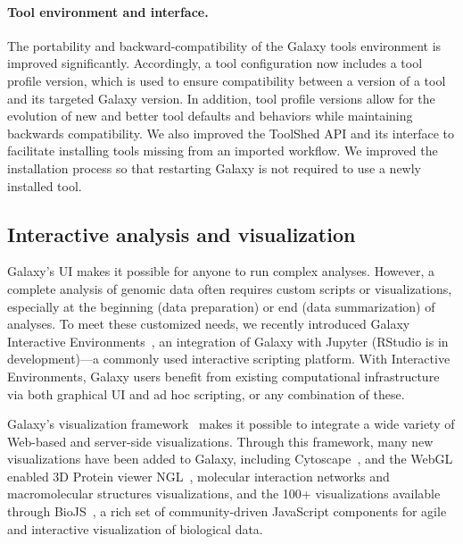 \paragraph*{Tool environment and interface.}
The portability and backward-compatibility of the Galaxy tools environment is improved significantly. Accordingly, a tool configuration now includes a tool profile version, which is used to ensure compatibility between a version of a tool and its targeted Galaxy version. In addition, tool profile versions allow for the evolution of new and better tool defaults and behaviors while maintaining backwards compatibility. We also improved the ToolShed API and its interface to facilitate installing tools missing from an imported workflow. We improved the installation process so that restarting Galaxy is not required to use a newly installed tool.

\subsection*{Interactive analysis and visualization}
Galaxy’s UI makes it possible for anyone to run complex analyses. However, a complete analysis of genomic data often requires custom scripts or visualizations, especially at the beginning (data preparation) or end (data summarization) of analyses. To meet these customized needs, we recently introduced Galaxy Interactive Environments~\cite{gruning2017jupyter}, an integration of Galaxy with Jupyter (RStudio is in development)—a commonly used interactive scripting platform. With Interactive Environments, Galaxy users benefit from existing computational infrastructure via both graphical UI and ad hoc scripting, or any combination of these.

Galaxy’s visualization framework~\cite{goecks2013web} makes it possible to integrate a wide variety of Web-based and server-side visualizations. Through this framework, many new visualizations have been added to Galaxy, including Cytoscape~\cite{shannon2003cytoscape}, and the WebGL enabled 3D Protein viewer NGL~\cite{rose2015ngl}, molecular interaction networks and macromolecular structures visualizations, and the 100+ visualizations available through BioJS~\cite{gomez2013biojs}, a rich set of community-driven JavaScript components for agile and interactive visualization of biological data.

